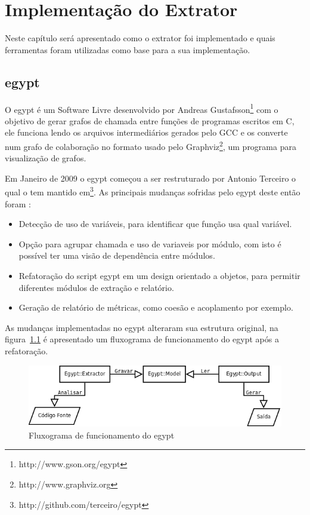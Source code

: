 \chapter{Implementação do Extrator} \label{ch:implementacao}

Neste capítulo será apresentado como o extrator foi implementado e quais
ferramentas foram utilizadas como base para a sua implementação.

\section{egypt} \label{sec:egypt}

O egypt é um Software Livre desenvolvido por Andreas
Gustafsson\footnote{http://www.gson.org/egypt} com o objetivo de gerar grafos
de chamada entre funções de programas escritos em C, ele funciona lendo os
arquivos intermediários gerados pelo GCC e os
converte num grafo de colaboração no formato usado pelo
Graphviz\footnote{http://www.graphviz.org}, um programa para visualização de
grafos.

Em Janeiro de 2009 o egypt começou a ser restruturado por
Antonio Terceiro o qual o tem mantido
em\footnote{http://github.com/terceiro/egypt}. As principais mudanças sofridas
pelo egypt deste então foram \cite{structuralComplexityEvolution}:

\begin{itemize}
\item Detecção de uso de variáveis, para identificar que função usa qual
variável.
\item Opção para agrupar chamada e uso de variaveis por módulo, com isto é
possível ter uma visão de dependência entre módulos.
\item Refatoração do script egypt em um design orientado a objetos, para
permitir diferentes módulos de extração e relatório.
\item Geração de relatório de métricas, como coesão e acoplamento por exemplo.
\end{itemize}

As mudanças implementadas no egypt alteraram sua estrutura original, na
figura~\ref{fig:egypt-fluxogram} é apresentado um fluxograma de funcionamento
do egypt após a refatoração.

\begin{figure}[h]
\center
\includegraphics[scale=0.4]{imagens/egypt-fluxogram}
\caption{Fluxograma de funcionamento do egypt}
\label{fig:egypt-fluxogram}
\end{figure}

